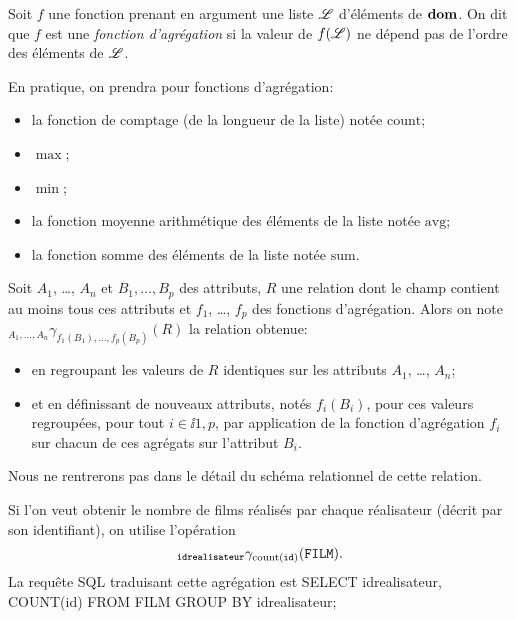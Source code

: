 \begin{defi}
  Soit $f$ une fonction prenant en argument une liste $\mathscr{L}$ d'éléments
  de $\mathbf{dom}$. On dit que $f$ est une \emph{fonction d'agrégation} si la
  valeur de $f(\mathscr{L})$ ne dépend pas de l'ordre des éléments de $\mathscr{L}$.
\end{defi}
En pratique, on prendra pour fonctions d'agrégation:
\begin{itemize}
\item la fonction de comptage (de la longueur de la liste) notée $\mathrm{count}$;
\item $\max$;
\item $\min$;
\item la fonction moyenne arithmétique des éléments de la liste notée $\mathrm{avg}$;
\item la fonction somme des éléments de la liste notée $\mathrm{sum}$.
\end{itemize}
\begin{defi}
  Soit $A_{1}$, \ldots{}, $A_{n}$ et $B_{1}, \ldots,B_{p}$ des
  attributs, $R$ une relation dont le champ contient au moins tous
  ces attributs et $f_{1}$, \ldots{}, $f_{p}$ des fonctions d'agrégation.
  Alors on note
  ${}_{A_{1},\ldots,A_{n}}\gamma_{f_1(B_{1}),\ldots,f_p(B_{p})}(R)$ la relation
  obtenue:
  \begin{itemize}
  \item en regroupant les valeurs de $R$ identiques sur les attributs
    $A_{1}$, \ldots{}, $A_{n}$;
  \item et en définissant de nouveaux attributs, notés $f_{i}(B_{i})$,
    pour ces valeurs regroupées, pour tout $i\in\ii{1,p}$, par
    application de la fonction d'agrégation $f_{i}$ sur chacun de ces
    agrégats sur l'attribut $B_{i}$.
  \end{itemize}
\end{defi}
\begin{rem}
  Nous ne rentrerons pas dans le détail du schéma relationnel de cette relation. 
\end{rem}

\begin{exemple}
  Si l'on veut obtenir le nombre de films réalisés par chaque réalisateur (décrit par son identifiant), on utilise l'opération
  \begin{equation*}
    {}_{\mathtt{idrealisateur}}\gamma_{\mathrm{count}(\mathtt{id})}(\mathtt{FILM}).
  \end{equation*}
  La requête SQL traduisant cette agrégation est 
SELECT idrealisateur, COUNT(id)
FROM FILM
GROUP BY idrealisateur;
\end{exemple}


